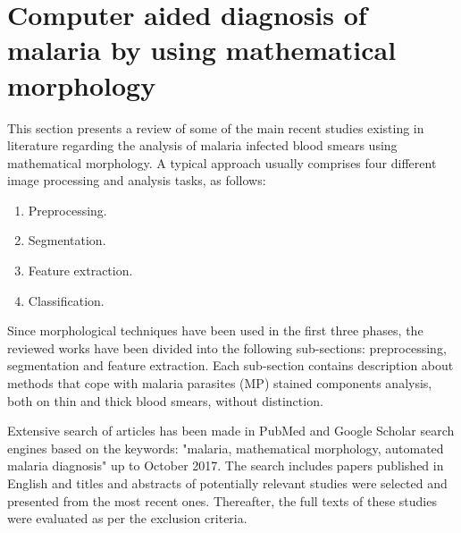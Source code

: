 \documentclass[sensors,review,submit,moreauthors,pdftex,10pt,a4paper]{mdpi}
\begin{document}
\section{Computer aided diagnosis of malaria by using mathematical morphology}
This section presents a review of some of the main recent studies existing in literature regarding the analysis of malaria infected blood smears using mathematical morphology.
A typical approach usually comprises four different image processing and analysis tasks, as follows:
\begin{enumerate}
	\item Preprocessing.
	\item Segmentation.
	\item Feature extraction.
	\item Classification.
\end{enumerate}
Since morphological techniques have been used in the first three phases, the reviewed works have been divided into the following sub-sections: preprocessing, segmentation and feature extraction.
Each sub-section contains description about methods that cope with malaria parasites (MP) stained components analysis, both on thin and thick blood smears, without distinction.

Extensive search of articles has been made in PubMed and Google Scholar search engines based on the keywords: "malaria, mathematical morphology, automated malaria diagnosis" up to October 2017. The search includes papers published in English and titles and abstracts of potentially relevant studies were selected and presented from the most recent ones. Thereafter, the full texts of these studies were evaluated as per the exclusion criteria.
\end{document}
